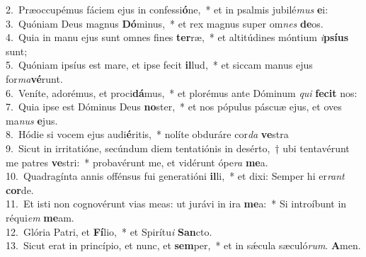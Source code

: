 {2.~}Præoccupémus fáciem ejus in confessi\textbf{ó}ne,~* et in psalmis jubilé\textit{mus} \textbf{e}i:\\
{3.~}Quóniam Deus magnus \textbf{Dó}minus,~* et rex magnus super om\textit{nes} \textbf{de}os.\\
{4.~}Quia in manu ejus sunt omnes fines \textbf{ter}ræ,~* et altitúdines móntium \textit{i}\textbf{psí}\textbf{us} sunt;\\
{5.~}Quóniam ipsíus est mare, et ipse fecit \textbf{il}lud,~* et siccam manus ejus for\textit{ma}\textbf{vé}runt.\\
{6.~}Veníte, adorémus, et proci\textbf{dá}mus,~* et plorémus ante Dóminum \textit{qui} \textbf{fe}\textbf{cit} nos:\\
{7.~}Quia ipse est Dóminus Deus \textbf{no}ster,~* et nos pópulus páscuæ ejus, et oves ma\textit{nus} \textbf{e}jus.\\
{8.~}Hódie si vocem ejus audi\textbf{é}ritis,~* nolíte obduráre cor\textit{da} \textbf{ve}stra\\
{9.~}Sicut in irritatióne, secúndum diem tentatiónis in desérto,~† ubi tentavérunt me patres \textbf{ve}stri:~* probavérunt me, et vidérunt ópe\textit{ra} \textbf{me}a.\\
{10.~}Quadragínta annis offénsus fui generatióni \textbf{il}li,~* et dixi: Semper hi er\textit{rant} \textbf{cor}de.\\
{11.~}Et isti non cognovérunt vias meas: ut jurávi in ira \textbf{me}a:~* Si introíbunt in réqui\textit{em} \textbf{me}am.\\
{12.~}Glória Patri, et \textbf{Fí}lio,~* et Spirítu\textit{i} \textbf{San}cto.\\
{13.~}Sicut erat in princípio, et nunc, et \textbf{sem}per,~* et in sǽcula sæculó\textit{rum}. \textbf{A}men.\\
